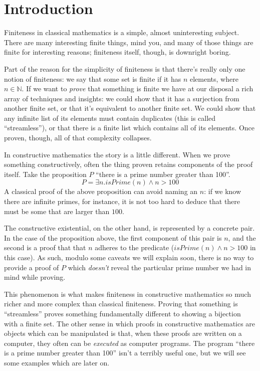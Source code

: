 \section{Introduction}
Finiteness in classical mathematics is a simple, almost uninteresting subject.
There are many interesting finite things, mind you, and many of those things are
finite for interesting reasons; finiteness itself, though, is downright boring.

Part of the reason for the simplicity of finiteness is that there's really only
one notion of finiteness: we say that some set is finite if it has \(n\) 
elements, where \(n \in \mathbb{N}\).
If we want to \emph{prove} that something is finite we have at our disposal a
rich array of techniques and insights: we could show that it has a surjection
from another finite set, or that it's equivalent to another finite set.
We could show that any infinite list of its elements must contain duplicates
(this is called ``streamless''), or that there is a finite list which contains
all of its elements.
Once proven, though, all of that complexity collapses.

In constructive mathematics the story is a little different.
When we prove something constructively, often the thing proven retains
components of the proof itself.
Take the proposition \(P\) ``there is a prime number greater than 100''.
\begin{equation}
  P = \exists n. \mathit{isPrime}(n) \wedge n > 100
\end{equation}
A classical proof of the above proposition can avoid naming an \(n\): if we know
there are infinite primes, for instance, it is not too hard to deduce that there
must be some that are larger than \(100\).

The constructive existential, on the other hand, is represented by a concrete
pair.
In the case of the proposition above, the first component of this pair is \(n\),
and the second is a proof that that \(n\) adheres to the predicate
(\(\mathit{isPrime}(n) \wedge n > 100\) in this case).
As such, modulo some caveats we will explain soon, there is no way to provide a
proof of \(P\) which \emph{doesn't} reveal the particular prime number we had in
mind while proving.

This phenomenon is what makes finiteness in constructive mathematics so much
richer and more complex than classical finiteness.
Proving that something is ``streamless'' proves something fundamentally
different to showing a bijection with a finite set.
The other sense in which proofs in constructive mathematics are objects which
can be manipulated is that, when these proofs are written on a computer, they
often can be \emph{executed} as computer programs.
The program ``there is a prime number greater than 100'' isn't a terribly useful
one, but we will see some examples which are later on.

